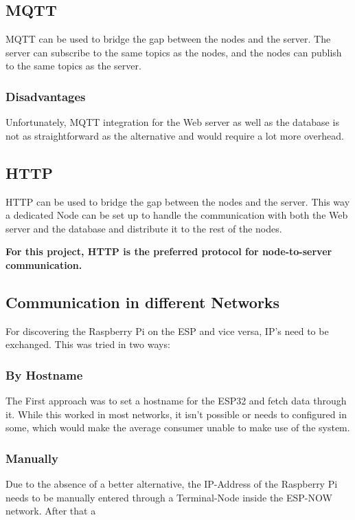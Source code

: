     \subsection{MQTT}
    MQTT can be used to bridge the gap between the nodes and the server.
    The server can subscribe to the same topics as the nodes, and the nodes
    can publish to the same topics as the server.

        \subsubsection{Disadvantages}
        Unfortunately, MQTT integration for the Web server as well as the database
        is not as straightforward as the alternative and would require a lot more 
        overhead.

    \subsection{HTTP}
    HTTP can be used to bridge the gap between the nodes and the server.
    This way a dedicated Node can be set up to handle the communication
    with both the Web server and the database and distribute it to the 
    rest of the nodes.

    \vspace{1cm}
    \textbf{For this project, HTTP is the preferred protocol for 
    node-to-server communication.}

    \subsection{Communication in different Networks}
    For discovering the Raspberry Pi on the ESP and vice versa,
    IP's need to be exchanged. This was tried in two ways:
        \subsubsection{By Hostname}
        The First approach was to set a hostname for the 
        ESP32 and fetch data through it. While this worked
        in most networks, it isn't possible or needs to 
        configured in some, which would make the average 
        consumer unable to make use of the system.

        \subsubsection{Manually}
        Due to the absence of a better alternative, the
        IP-Address of the Raspberry Pi needs to be manually
        entered through a Terminal-Node inside the ESP-NOW
        network. After that a 

